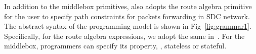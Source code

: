 


In addition to the middlebox primitives, \concept{} also adopts the route algebra
primitive~\cite{gao2018t} for the user to specify path constraints for packets
forwarding in SDC network. The abstract syntax of the \concept{} programming model
is shown in Fig~\ref{fig:grammar1}. Specifically, for the route algebra expressions, we adopt the same in~\cite{gao2018t}. For the middlebox, programmers can specify its property, \ie, stateless or stateful. 


